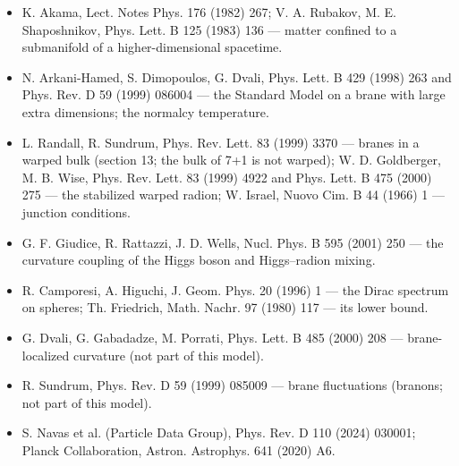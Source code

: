 \documentclass[10pt,a4paper]{article}
\begin{document}
\begin{itemize}
\item K. Akama, Lect. Notes Phys. 176 (1982) 267; V. A. Rubakov, M. E. Shaposhnikov, Phys. Lett. B 125 (1983) 136 — matter confined to a submanifold of a higher-dimensional spacetime.
\item N. Arkani-Hamed, S. Dimopoulos, G. Dvali, Phys. Lett. B 429 (1998) 263 and Phys. Rev. D 59 (1999) 086004 — the Standard Model on a brane with large extra dimensions; the normalcy temperature.
\item L. Randall, R. Sundrum, Phys. Rev. Lett. 83 (1999) 3370 — branes in a warped bulk (section 13; the bulk of 7+1 is not warped); W. D. Goldberger, M. B. Wise, Phys. Rev. Lett. 83 (1999) 4922 and Phys. Lett. B 475 (2000) 275 — the stabilized warped radion; W. Israel, Nuovo Cim. B 44 (1966) 1 — junction conditions.
\item G. F. Giudice, R. Rattazzi, J. D. Wells, Nucl. Phys. B 595 (2001) 250 — the curvature coupling of the Higgs boson and Higgs–radion mixing.
\item R. Camporesi, A. Higuchi, J. Geom. Phys. 20 (1996) 1 — the Dirac spectrum on spheres; Th. Friedrich, Math. Nachr. 97 (1980) 117 — its lower bound.
\item G. Dvali, G. Gabadadze, M. Porrati, Phys. Lett. B 485 (2000) 208 — brane-localized curvature (not part of this model).
\item R. Sundrum, Phys. Rev. D 59 (1999) 085009 — brane fluctuations (branons; not part of this model).
\item S. Navas et al. (Particle Data Group), Phys. Rev. D 110 (2024) 030001; Planck Collaboration, Astron. Astrophys. 641 (2020) A6.
\end{itemize}
\end{document}
